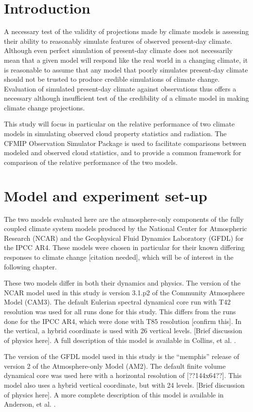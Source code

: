 \section{Introduction}
A necessary test of the validity of projections made by climate models is assessing their ability to reasonably simulate features of observed present-day climate. Although even perfect simulation of present-day climate does not necessarily mean that a given model will respond like the real world in a changing climate, it is reasonable to assume that any model that poorly simulates present-day climate should not be trusted to produce credible simulations of climate change. Evaluation of simulated present-day climate against observations thus offers a necessary although insufficient test of the credibility of a climate model in making climate change projections.

This study will focus in particular on the relative performance of two climate models in simulating observed cloud property statistics and radiation. The CFMIP Observation Simulator Package is used to facilitate comparisons between modeled and observed cloud statistics, and to provide a common framework for comparison of the relative performance of the two models.

\section{Model and experiment set-up}
The two models evaluated here are the atmosphere-only components of the fully coupled climate system models produced by the National Center for Atmospheric Research (NCAR) and the Geophysical Fluid Dynamics Laboratory (GFDL) for the IPCC AR4. These models were chosen in particular for their known differing responses to climate change [citation needed], which will be of interest in the following chapter.

These two models differ in both their dynamics and physics. The version of the NCAR model used in this study is version 3.1.p2 of the Community Atmosphere Model (CAM3). The default Eulerian spectral dynamical core run with T42 resolution was used for all runs done for this study. This differs from the runs done for the IPCC AR4, which were done with T85 resolution [confirm this]. In the vertical, a hybrid coordinate is used with 26 vertical levels. [Brief discussion of physics here]. A full description of this model is available in Collins, et al. \cite{cam3_description}.

The version of the GFDL model used in this study is the ``memphis'' release of version 2 of the Atmosphere-only Model (AM2). The default finite volume dynamical core was used here with a horizontal resolution of [??144x64??]. This model also uses a hybrid vertical coordinate, but with 24 levels. [Brief discussion of physics here]. A more complete description of this model is available in Anderson, et al. \cite{am2_evaluation}.

